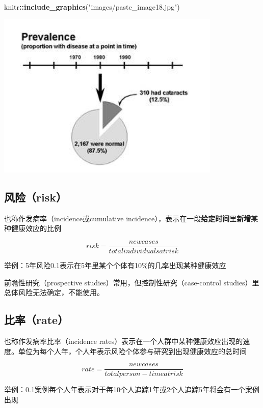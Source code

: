 \documentclass[]{book}
\newenvironment{Shaded}{\begin{snugshade}}{\end{snugshade}}
\newcommand{\KeywordTok}[1]{\textcolor[rgb]{0.13,0.29,0.53}{\textbf{#1}}}
\newcommand{\NormalTok}[1]{#1}
\newcommand{\OperatorTok}[1]{\textcolor[rgb]{0.81,0.36,0.00}{\textbf{#1}}}
\newcommand{\StringTok}[1]{\textcolor[rgb]{0.31,0.60,0.02}{#1}}
\begin{document}
\begin{Shaded}
\begin{Highlighting}[]
\NormalTok{knitr}\OperatorTok{::}\KeywordTok{include_graphics}\NormalTok{(}\StringTok{"images/paste_image18.jpg"}\NormalTok{)}
\end{Highlighting}
\end{Shaded}

\includegraphics[width=4.21in]{images/paste_image18}

\hypertarget{ux98ceux9669risk}{%
\subsection{风险（risk）}\label{ux98ceux9669risk}}

也称作发病率（incidence或cumulative incidence），表示在一段\textbf{给定时间}里\textbf{新增}某种健康效应的比例

\[risk = \frac{new cases}{total individuals at risk}\]

举例：5年风险0.1表示在5年里某个个体有10\%的几率出现某种健康效应

前瞻性研究（prospective studies）常用，但控制性研究（case-control studies）里总体风险无法确定，不能使用。

\hypertarget{ux6bd4ux7387rate}{%
\subsection{比率（rate）}\label{ux6bd4ux7387rate}}

也称作发病率比率（incidence rates）表示在一个人群中某种健康效应出现的速度。单位为每个人年，个人年表示风险个体参与研究到出现健康效应的总时间

\[rate = \frac{new cases}{total person-time at risk}\]

举例：0.1案例每个人年表示对于每10个人追踪1年或2个人追踪5年将会有一个案例出现
\end{document}
